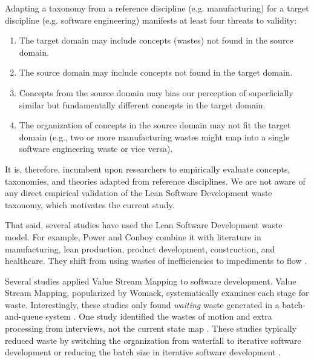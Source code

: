 Adapting a taxonomy from a reference discipline (e.g. manufacturing) for a target discipline (e.g. software engineering) manifests at least four threats to validity: 
\begin{enumerate}
  \item The target domain may include concepts (wastes) not found in the source domain. 
  \item The source domain may include concepts not found in the target domain.
  \item Concepts from the source domain may bias our perception of superficially similar but fundamentally different concepts in the target domain.
  \item The organization of concepts in the source domain may not fit the target domain (e.g., two or more manufacturing wastes might map into a single software engineering waste or vice versa). 
\end{enumerate}
It is, therefore, incumbent upon researchers to empirically evaluate concepts, taxonomies, and theories adapted from reference disciplines. We are not aware of any direct empirical validation of the Lean Software Development waste taxonomy, which motivates the current study. 

That said, several studies have used the Lean Software Development waste model. For example, Power and Conboy combine it with literature in manufacturing, lean production, product development, construction, and healthcare. They shift from using wastes of inefficiencies to impediments to flow \cite{PowerImpediments}.


Several studies applied Value Stream Mapping to software development. Value Stream Mapping, popularized by Womack, systematically examines each stage for waste. Interestingly, these studies only found \textit{waiting} waste generated in a batch-and-queue system \cite{Ali2016, Khurum2014, Mujtaba2010}. One study identified the wastes of motion and extra processing from interviews, not the current state map \cite{Mujtaba2010}. These studies typically reduced waste by switching the organization from waterfall to iterative software development or reducing the batch size in iterative software development \cite{Ali2016, Khurum2014, Mujtaba2010}.

